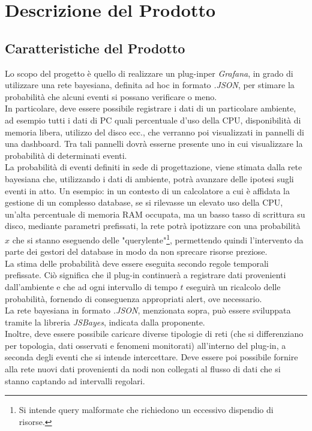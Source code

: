 \section{Descrizione del Prodotto}\label{DescrizioneProdotto}

\subsection{Caratteristiche del Prodotto}\label{CaratteristicheProdotto}
Lo scopo del progetto è quello di realizzare un plug-in\glossario per \textit{Grafana}\glossario, in grado di utilizzare una rete bayesiana\glossario, definita ad hoc in formato \textit{.JSON}\glossario, per stimare la probabilità che alcuni eventi si possano verificare o meno.\\
In particolare, deve essere possibile registrare i dati di un particolare ambiente, ad esempio tutti i dati di PC quali percentuale d'uso della CPU, disponibilità di memoria libera, utilizzo del disco ecc., che verranno poi visualizzati in pannelli di una dashboard\glossario. Tra tali pannelli dovrà esserne presente uno in cui visualizzare la probabilità di determinati eventi.\\
La probabilità di eventi definiti in sede di progettazione, viene stimata dalla rete bayesiana che, utilizzando i dati di ambiente, potrà avanzare delle ipotesi sugli eventi in atto. Un esempio: in un contesto di un calcolatore a cui è affidata la gestione di un complesso database\glossario, se si rilevasse un elevato uso della CPU, un'alta percentuale di memoria RAM occupata, ma un basso tasso di scrittura su disco, mediante parametri prefissati, la rete potrà ipotizzare con una probabilità $x$ che si stanno eseguendo delle "query\glossario lente"\footnote{Si intende query malformate che richiedono un eccessivo dispendio di risorse.}, permettendo quindi l'intervento da parte dei gestori del database in modo da non sprecare risorse preziose.\\
La stima delle probabilità deve essere eseguita secondo regole temporali prefissate. Ciò significa che il plug-in continuerà a registrare dati provenienti dall'ambiente e che ad ogni intervallo di tempo $t$ eseguirà un ricalcolo delle probabilità, fornendo di conseguenza appropriati alert, ove necessario.\\
La rete bayesiana in formato \textit{.JSON}, menzionata sopra, può essere sviluppata tramite la libreria \textit{JSBayes}\glossario, indicata dalla proponente.\\
Inoltre, deve essere possibile caricare diverse tipologie di reti (che si differenziano per topologia, dati osservati e fenomeni monitorati) all'interno del plug-in, a seconda degli eventi che si intende intercettare. Deve essere poi possibile fornire alla rete nuovi dati provenienti da nodi non collegati al flusso di dati che si stanno captando ad intervalli regolari.

